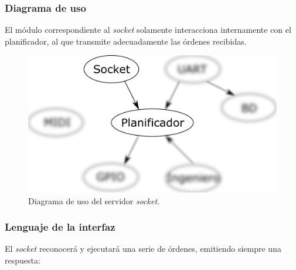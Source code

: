 \subsubsection{Diagrama de uso}

El módulo correspondiente al \textit{socket} solamente interacciona internamente con el planificador, al que transmite adecuadamente las órdenes recibidas.

\smallskip

\begin{figure}[H]
	\noindent \begin{centering}
		\includegraphics[width=\linewidth/2]{capitulo4/daemon_socket}
		\par\end{centering}
	\smallskip
	\caption{\label{fig:daemon_socket} Diagrama de uso del servidor \textit{socket}.}
\end{figure} 

\smallskip

\subsubsection{Lenguaje de la interfaz}

El \textit{socket} reconocerá y ejecutará una serie de órdenes, emitiendo siempre una respuesta:

